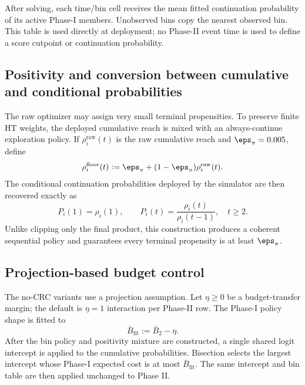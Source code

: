 After solving, each time/bin cell receives the mean fitted continuation
probability of its active Phase-I members.  Unobserved bins copy the nearest
observed bin.  This table is used directly at deployment; no Phase-II event
time is used to define a score cutpoint or continuation probability.

\subsection{Positivity and conversion between cumulative and conditional probabilities}

The raw optimizer may assign very small terminal propensities.  To preserve
finite HT weights, the deployed cumulative reach is mixed with an
always-continue exploration policy.  If $\rho_i^{\mathrm{raw}}(t)$ is the raw
cumulative reach and $\eps_{\pi}=0.005$, define
\begin{equation}
    \rho_i^{\mathrm{floor}}(t)
    :=\eps_{\pi}+(1-\eps_{\pi})
      \rho_i^{\mathrm{raw}}(t).
    \label{eq:terminal_floor_mixture}
\end{equation}
The conditional continuation probabilities deployed by the simulator are
then recovered exactly as
\begin{equation}
    P_i(1)=\rho_i(1),
    \qquad
    P_i(t)=\frac{\rho_i(t)}{\rho_i(t-1)},\quad t\geq2.
    \label{eq:cumulative_to_conditional}
\end{equation}
Unlike clipping only the final product, this construction produces a coherent
sequential policy and guarantees every terminal propensity is at least
$\eps_{\pi}$.

\subsection{Projection-based budget control}

The no-CRC variants use a projection assumption.  Let $\eta\geq0$ be a
budget-transfer margin; the default is $\eta=1$ interaction per Phase-II row.
The Phase-I policy shape is fitted to
\begin{equation}
    \bar B_{\mathrm{fit}}:=\bar B_2-\eta.
\end{equation}
After the bin policy and positivity mixture are constructed, a single shared
logit intercept is applied to the cumulative probabilities.  Bisection
selects the largest intercept whose Phase-I expected cost is at most
$\bar B_{\mathrm{fit}}$.  The same intercept and bin table are then applied
unchanged to Phase II.


